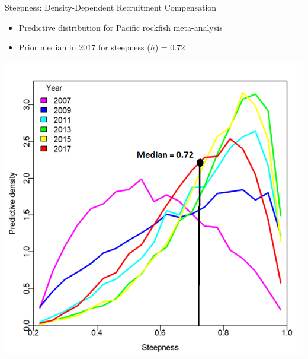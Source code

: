 \documentclass[pdf]{beamer}\usepackage[]{graphicx}\usepackage[]{color}
\begin{document}
\begin{frame}{Steepness: Density-Dependent Recruitment Compensation }
  \begin{itemize}
    \item Predictive distribution for Pacific rockfish meta-analysis
    \item Prior median in 2017 for steepness ($h$) = 0.72
  \end{itemize}
  \begin{center}
    \includegraphics[scale = 0.4]{figures/h_prior.png}
  \end{center}
\end{frame}
\end{document}
